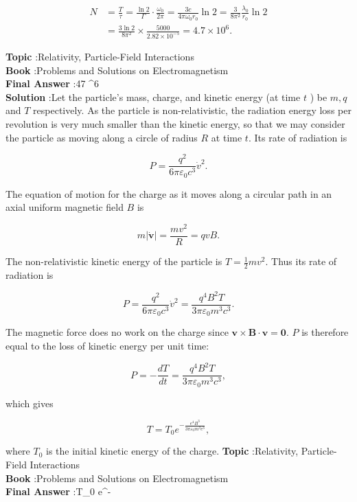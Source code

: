 \documentclass[10pt]{article}
\begin{document}
$$
\begin{aligned}
N &=\frac{T}{\tau}=\frac{\ln 2}{\Gamma} \cdot \frac{\omega_{0}}{2 \pi}=\frac{3 c}{4 \pi \omega_{0} r_{0}} \ln 2=\frac{3}{8 \pi^{2}} \frac{\lambda_{0}}{r_{0}} \ln 2 \\
&=\frac{3 \ln 2}{8 \pi^{2}} \times \frac{5000}{2.82 \times 10^{-5}}=4.7 \times 10^{6} .
\end{aligned}
$$

\textbf{Topic} :Relativity, Particle-Field Interactions\\
\textbf{Book} :Problems and Solutions on Electromagnetism\\
\textbf{Final Answer} :47 ^{6}\\


\textbf{Solution} :Let the particle's mass, charge, and kinetic energy (at time $t$ ) be $m, q$ and $T$ respectively. As the particle is non-relativistic, the radiation energy loss per revolution is very much smaller than the kinetic energy, so that we may consider the particle as moving along a circle of radius $R$ at time $t$. Its rate of radiation is

$$
P=\frac{q^{2}}{6 \pi \varepsilon_{0} c^{3}} \dot{v}^{2} .
$$

The equation of motion for the charge as it moves along a circular path in an axial uniform magnetic field $B$ is

$$
m|\dot{\mathbf{v}}|=\frac{m v^{2}}{R}=q v B .
$$

The non-relativistic kinetic energy of the particle is $T=\frac{1}{2} m v^{2}$. Thus its rate of radiation is

$$
P=\frac{q^{2}}{6 \pi \varepsilon_{0} c^{3}} \dot{v}^{2}=\frac{q^{4} B^{2} T}{3 \pi \varepsilon_{0} m^{3} c^{3}} .
$$

The magnetic force does no work on the charge since $\mathbf{v} \times \mathbf{B} \cdot \mathbf{v}=\mathbf{0}$. $P$ is therefore equal to the loss of kinetic energy per unit time:

$$
P=-\frac{d T}{d t}=\frac{q^{4} B^{2} T}{3 \pi \varepsilon_{0} m^{3} c^{3}},
$$

which gives

$$
T=T_{0} e^{-\frac{e^{4} B^{3}}{3 \pi \varepsilon_{0} m^{3} c^{3}}},
$$

where $T_{0}$ is the initial kinetic energy of the charge.
\textbf{Topic} :Relativity, Particle-Field Interactions\\
\textbf{Book} :Problems and Solutions on Electromagnetism\\
\textbf{Final Answer} :T_{0} e^{-}\\
\end{document}

